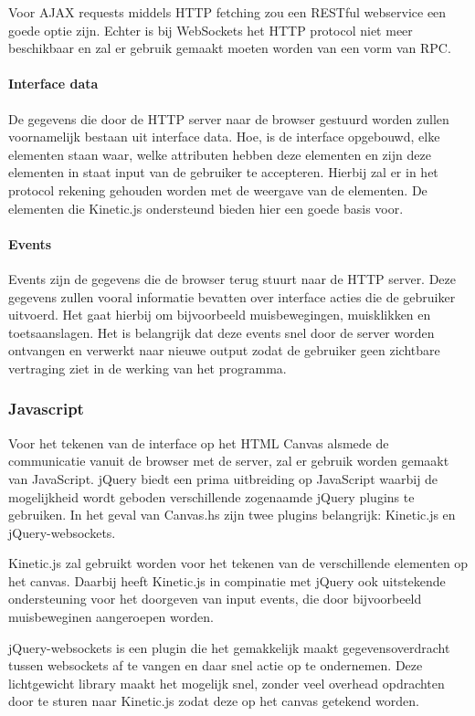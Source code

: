 Voor AJAX requests middels HTTP fetching zou een RESTful webservice een goede optie zijn. Echter is bij WebSockets het HTTP protocol niet meer beschikbaar en zal er gebruik gemaakt moeten worden van een vorm van RPC.

\paragraph{Interface data}
De gegevens die door de HTTP server naar de browser gestuurd worden zullen voornamelijk bestaan uit interface data. Hoe, is de interface opgebouwd, elke elementen staan waar, welke attributen hebben deze elementen en zijn deze elementen in staat input van de gebruiker te accepteren. Hierbij zal er in het protocol rekening gehouden worden met de weergave van de elementen. De elementen die Kinetic.js ondersteund bieden hier een goede basis voor.

\paragraph{Events}
Events zijn de gegevens die de browser terug stuurt naar de HTTP server. Deze gegevens zullen vooral informatie bevatten over interface acties die de gebruiker uitvoerd. Het gaat hierbij om bijvoorbeeld muisbewegingen, muisklikken en toetsaanslagen. Het is belangrijk dat deze events snel door de server worden ontvangen en verwerkt naar nieuwe output zodat de gebruiker geen zichtbare vertraging ziet in de werking van het programma.

\subsubsection{Javascript}
Voor het tekenen van de interface op het HTML Canvas alsmede de communicatie vanuit de browser met de server, zal er gebruik worden gemaakt van JavaScript. jQuery biedt een prima uitbreiding op JavaScript waarbij de mogelijkheid wordt geboden verschillende zogenaamde jQuery plugins te gebruiken. In het geval van Canvas.hs zijn twee plugins belangrijk: Kinetic.js en jQuery-websockets.

Kinetic.js zal gebruikt worden voor het tekenen van de verschillende elementen op het canvas. Daarbij heeft Kinetic.js in compinatie met jQuery ook uitstekende ondersteuning voor het doorgeven van input events, die door bijvoorbeeld muisbeweginen aangeroepen worden. 

jQuery-websockets is een plugin die het gemakkelijk maakt gegevensoverdracht tussen websockets af te vangen en daar snel actie op te ondernemen. Deze lichtgewicht library maakt het mogelijk snel, zonder veel overhead opdrachten door te sturen naar Kinetic.js zodat deze op het canvas getekend worden.

